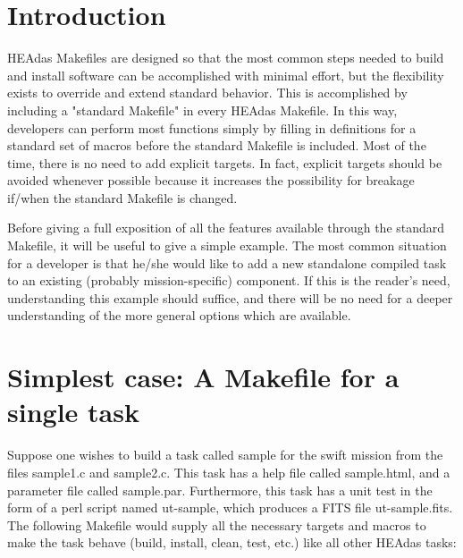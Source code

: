 \documentclass[11pt]{book}
\begin{document}
\section{Introduction}
HEAdas Makefiles are designed so that the most
common steps needed to build and install software
can be accomplished with minimal effort, but the
flexibility exists to override and extend standard
behavior. This is accomplished by including a "standard
Makefile" in every HEAdas Makefile. In this way,
developers can perform most functions simply by filling
in definitions for a standard set of macros before the
standard Makefile is included. Most of the time,
there is no need to add explicit targets. In fact,
explicit targets should be avoided whenever possible
because it increases the possibility for breakage
if/when the standard Makefile is changed.

Before giving a full exposition of all the features
available through the standard Makefile, it will be
useful to give a simple example. The most common situation
for a developer is that he/she would like to add a new
standalone compiled task to an existing (probably mission-specific)
component. If this is the reader's need, understanding
this example should suffice, and there will be no need for
a deeper understanding of the more general options which
are available.

\section{Simplest case: A Makefile for a single task}

Suppose one wishes to build a task called sample for
the swift mission from the files sample1.c and
sample2.c. This task has a help file called sample.html,
and a parameter file called sample.par. Furthermore,
this task has a unit test in the form of a perl script
named ut-sample, which produces a FITS file ut-sample.fits.
The following Makefile would supply all
the necessary targets and macros to make the task behave
(build, install, clean, test, etc.) like all other HEAdas
tasks:
\end{document}
